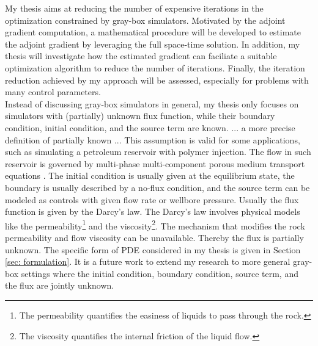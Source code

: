 My thesis aims at reducing the number of expensive iterations in the optimization constrained by
gray-box simulators. 
Motivated by the adjoint gradient computation, a mathematical procedure will be developed to estimate the
adjoint gradient by leveraging the full space-time solution. In addition,
my thesis will investigate how the estimated gradient can faciliate a suitable 
optimization algorithm to reduce the number of iterations. 
Finally, the iteration reduction achieved by my approach will be assessed, especially 
for problems with many control parameters.\\

Instead of discussing gray-box simulators in general, my thesis only focuses on
simulators with (partially) unknown flux function, while their boundary condition,
initial condition, and the source term are known. 
... a more precise definition of partially known ...
This assumption is valid for some applications,
such as simulating a petroleum reservoir with polymer injection.
The flow in such reservoir is governed by multi-phase multi-component porous medium transport 
equations \cite{reservoir sim book}. The initial condition is usually given at the equilibrium state, the boundary
is usually described by a no-flux condition, and the source term can be modeled as controls
with given flow rate or wellbore pressure.
Usually the flux function is given by the Darcy's law.
The Darcy's law involves physical models like the permeability\footnote{The permeability quantifies the
easiness of liquids to pass through the rock.} and the viscosity\footnote{The viscosity quantifies the
internal friction of the liquid flow.}.
The mechanism that modifies the rock permeability and flow viscosity can be unavailable. Thereby the flux is partially unknown.
The specific form of PDE considered in my thesis is given in Section \ref{sec: formulation}.
It is a future work to extend my research to more general gray-box settings where
the initial condition, boundary condition, source term, and the flux are jointly unknown.\\



